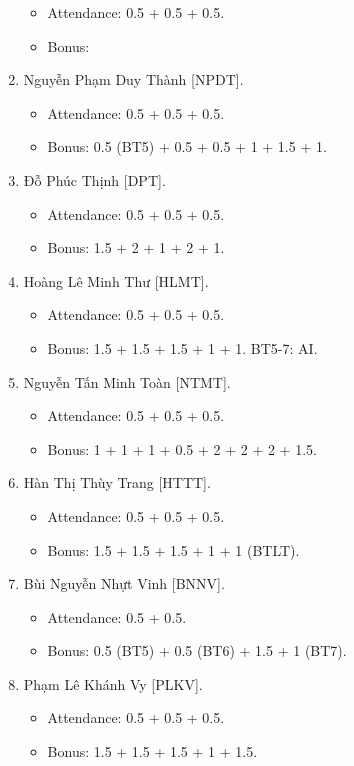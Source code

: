 \documentclass{article}
\begin{document}
\begin{enumerate}
    \begin{itemize}
        \item Attendance: 0.5 + 0.5 + 0.5.
        \item Bonus:
    \end{itemize}
    \item {\sc Nguyễn Phạm Duy Thành [NPDT].}
    \begin{itemize}
        \item Attendance: 0.5 + 0.5 + 0.5.
        \item Bonus: 0.5 (BT5) + 0.5 + 0.5 + 1 + 1.5 + 1.
    \end{itemize}
    \item {\sc Đỗ Phúc Thịnh [DPT].}
    \begin{itemize}
        \item Attendance: 0.5 + 0.5 + 0.5.
        \item Bonus: 1.5 + 2 + 1 + 2 + 1.
    \end{itemize}
    \item {\sc Hoàng Lê Minh Thư [HLMT].}
    \begin{itemize}
        \item Attendance: 0.5 + 0.5 + 0.5.
        \item Bonus: 1.5 + 1.5 + 1.5 + 1 + 1. BT5-7: AI.
    \end{itemize}
    \item {\sc Nguyễn Tấn Minh Toàn [NTMT].}
    \begin{itemize}
        \item Attendance: 0.5 + 0.5 + 0.5.
        \item Bonus: 1 + 1 + 1 + 0.5 + 2 + 2 + 2 + 1.5.
    \end{itemize}
    \item {\sc Hàn Thị Thùy Trang [HTTT].}
    \begin{itemize}
        \item Attendance: 0.5 + 0.5 + 0.5.
        \item Bonus: 1.5 + 1.5 + 1.5 + 1 + 1 (BTLT).
    \end{itemize}
    \item {\sc Bùi Nguyễn Nhựt Vinh [BNNV].}
    \begin{itemize}
        \item Attendance: 0.5 + 0.5.
        \item Bonus: 0.5 (BT5) + 0.5 (BT6) + 1.5 + 1 (BT7).
    \end{itemize}
    \item {\sc Phạm Lê Khánh Vy [PLKV].}
    \begin{itemize}
        \item Attendance: 0.5 + 0.5 + 0.5.
        \item Bonus: 1.5 + 1.5 + 1.5 + 1 + 1.5.
    \end{itemize}
\end{enumerate}
\end{document}
